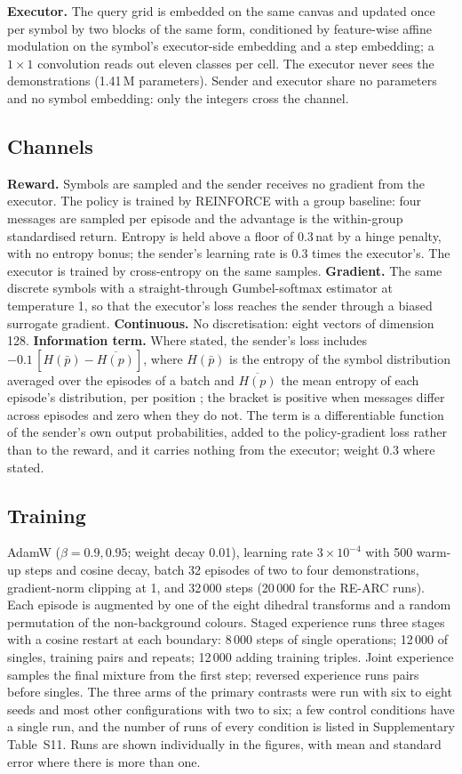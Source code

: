\documentclass{nature}
\begin{document}
\begin{methods}
\textbf{Executor.} The query grid is embedded on the same canvas and updated once per symbol by two
blocks of the same form, conditioned by feature-wise affine modulation on the symbol's executor-side
embedding and a step embedding; a $1\times1$ convolution reads out eleven classes per cell. The
executor never sees the demonstrations (1.41\,M parameters). Sender and executor share no parameters
and no symbol embedding: only the integers cross the channel.

\subsection{Channels}
\textbf{Reward.} Symbols are sampled and the sender receives no gradient from the executor. The
policy is trained by REINFORCE with a group baseline: four messages are sampled per episode and the
advantage is the within-group standardised return. Entropy is held above a floor of 0.3\,nat by a
hinge penalty, with no entropy bonus; the sender's learning rate is 0.3 times the executor's. The
executor is trained by cross-entropy on the same samples. \textbf{Gradient.} The same discrete
symbols with a straight-through Gumbel-softmax estimator at temperature 1, so that the executor's loss
reaches the sender through a biased surrogate gradient. \textbf{Continuous.} No discretisation:
eight vectors of dimension 128. \textbf{Information term.} Where stated, the sender's loss includes
$-0.1\,[H(\bar p) - \overline{H(p)}]$, where $H(\bar p)$ is the entropy of the symbol distribution averaged over
the episodes of a batch and $\overline{H(p)}$ the mean entropy of each episode's distribution, per position
\cite{eccles2019}; the bracket is positive when messages differ across episodes and zero when they do not. The
term is a differentiable function of the sender's own output probabilities, added to the policy-gradient loss
rather than to the reward, and it carries nothing from the executor; weight 0.3 where stated.

\subsection{Training}
AdamW ($\beta=0.9, 0.95$; weight decay 0.01), learning rate $3\times10^{-4}$ with 500 warm-up steps and
cosine decay, batch 32 episodes of two to four demonstrations, gradient-norm clipping at 1, and 32\,000
steps (20\,000 for the RE-ARC runs). Each episode is augmented by one of the eight dihedral transforms
and a random permutation of the non-background colours. Staged experience runs three stages with a
cosine restart at each boundary: 8\,000 steps of single operations; 12\,000 of singles, training pairs
and repeats; 12\,000 adding training triples. Joint experience samples the final mixture from the
first step; reversed experience runs pairs before singles. The three arms of the primary contrasts were run with six to eight
seeds and most other configurations with two to six; a few control conditions have a single run, and the number of runs of every condition is listed in
Supplementary Table~S11. Runs are shown individually in the figures, with mean and standard error where there is
more than one.


\end{methods}
\end{document}
